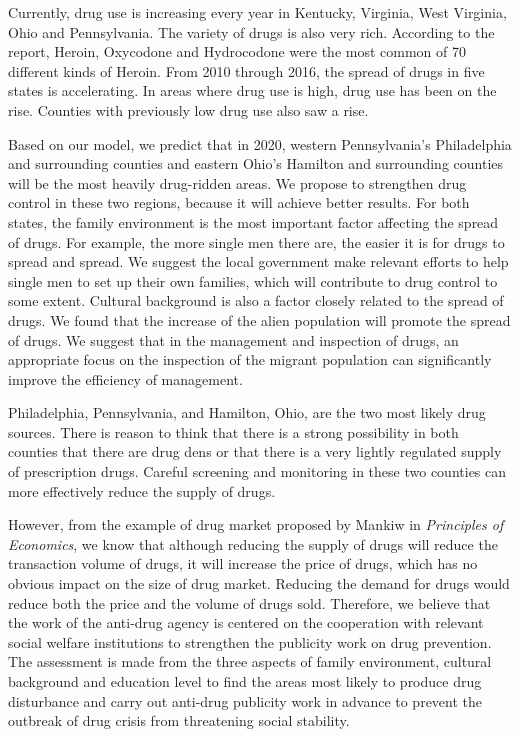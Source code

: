 \documentclass{mcmthesis}
\begin{document}
Currently, drug use is increasing every year in Kentucky, Virginia, West Virginia, Ohio and Pennsylvania. The variety of drugs is also very rich. According to the report, Heroin, Oxycodone and Hydrocodone were the most common of 70 different kinds of Heroin. From 2010 through 2016, the spread of drugs in five states is accelerating. In areas where drug use is high, drug use has been on the rise. Counties with previously low drug use also saw a rise. \par
Based on our model, we predict that in 2020, western Pennsylvania's Philadelphia and surrounding counties and eastern Ohio's Hamilton and surrounding counties will be the most heavily drug-ridden areas. We propose to strengthen drug control in these two regions, because it will achieve better results. For both states, the family environment is the most important factor affecting the spread of drugs. For example, the more single men there are, the easier it is for drugs to spread and spread. We suggest the local government make relevant efforts to help single men to set up their own families, which will contribute to drug control to some extent. Cultural background is also a factor closely related to the spread of drugs. We found that the increase of the alien population will promote the spread of drugs. We suggest that in the management and inspection of drugs, an appropriate focus on the inspection of the migrant population can significantly improve the efficiency of management. \par

Philadelphia, Pennsylvania, and Hamilton, Ohio, are the two most likely drug sources. There is reason to think that there is a strong possibility in both counties that there are drug dens or that there is a very lightly regulated supply of prescription drugs. Careful screening and monitoring in these two counties can more effectively reduce the supply of drugs.\par

However, from the example of drug market proposed by Mankiw in \emph{Principles of Economics}, we know that although reducing the supply of drugs will reduce the transaction volume of drugs, it will increase the price of drugs, which has no obvious impact on the size of drug market. Reducing the demand for drugs would reduce both the price and the volume of drugs sold. Therefore, we believe that the work of the anti-drug agency is centered on the cooperation with relevant social welfare institutions to strengthen the publicity work on drug prevention. The assessment is made from the three aspects of family environment, cultural background and education level to find the areas most likely to produce drug disturbance and carry out anti-drug publicity work in advance to prevent the outbreak of drug crisis from threatening social stability.\par
\end{document}
